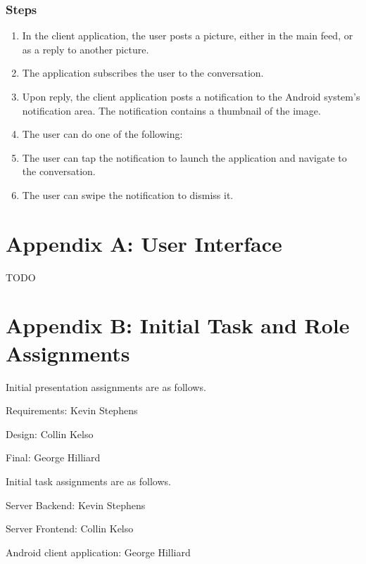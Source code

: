 \documentclass[11pt]{scrartcl}
\let\stdsection\section
\renewcommand\section{\newpage\stdsection}
\begin{document}
        \subsubsection{Steps}
            \begin{enumerate}
                \item In the client application, the user posts a picture, either in the main feed, or as a reply to another picture.
                \item The application subscribes the user to the conversation.
                \item Upon reply, the client application posts a notification to the Android system's notification area.  The notification contains a thumbnail of the image.
                \item The user can do one of the following:
                \item The user can tap the notification to launch the application and navigate to the conversation.
                \item The user can swipe the notification to dismiss it.
            \end{enumerate}

\section*{Appendix A: User Interface}
    TODO

\section*{Appendix B: Initial Task and Role Assignments}
    Initial presentation assignments are as follows.
    \begin{description*}
        \item[Requirements:] Kevin Stephens
        \item[Design:] Collin Kelso
        \item[Final:] George Hilliard
    \end{description*}

    Initial task assignments are as follows.
    \begin{description*}
        \item[Server Backend:] Kevin Stephens
        \item[Server Frontend:] Collin Kelso
        \item[Android client application:] George Hilliard
    \end{description*}
\end{document}
